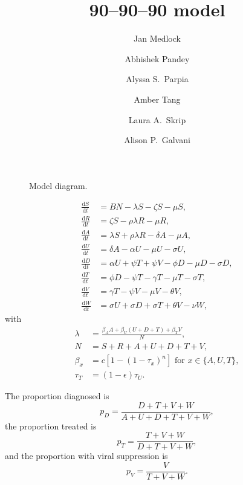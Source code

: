 \documentclass{article}
\title{90--90--90 model}
\author{
  Jan Medlock
  \and
  Abhishek Pandey
  \and
  Alyssa S.~Parpia
  \and
  Amber Tang
  \and
  Laura A.~Skrip
  \and
  Alison P.~Galvani}
\newcommand{\md}{\mathrm{d}}
\begin{document}
\maketitle


\begin{figure}
  \centering
  
  \caption{Model diagram.}
\end{figure}


\begin{equation}
  \label{model_eqns}
  \begin{split}
    \frac{\md S}{\md t} &= B N - \lambda S - \zeta S- \mu S,
    \\
     \frac{\md R}{\md t} & = \zeta S - \rho \lambda R - \mu R,
    \\
    \frac{\md A}{\md t} &= \lambda S +\rho \lambda R - \delta A - \mu A,
    \\
    \frac{\md U}{\md t} &= \delta A - \alpha U - \mu U - \sigma U,
    \\
    \frac{\md D}{\md t} &=  \alpha U + \psi T + \psi V
    - \phi D - \mu D - \sigma D,
    \\
    \frac{\md T}{\md t} &= \phi D - \psi T - \gamma T - \mu T
    - \sigma T,
    \\
    \frac{\md V}{\md t} &= \gamma T - \psi V - \mu V - \theta V,
    \\
    \frac{\md W}{\md t} &= \sigma U + \sigma D + \sigma T + \theta V -
    \nu W,
  \end{split}
\end{equation}
with
\begin{equation}
  \label{force_of_infection}
  \begin{split}
    \lambda &= \frac{\beta_A A + \beta_U (U + D + T) + \beta_T V}{N},
    \\
    N &= S + R +  A + U + D + T + V,
    \\
    \beta_x &= c \left[1 - (1 - \tau_x)^n\right]
    \text{ for $x \in \{A, U, T\}$},
    \\
    \tau_T &= (1 - \epsilon) \tau_U.
  \end{split}
\end{equation}

The proportion diagnosed is
\begin{equation}
  p_D = \frac{D + T + V + W}{A + U + D + T + V + W},
\end{equation}
the proportion treated is
\begin{equation}
  p_T = \frac{T + V + W}{D + T + V + W},
\end{equation}
and the proportion with viral suppression is
\begin{equation}
  p_V = \frac{V}{T + V + W}.
\end{equation}
\end{document}
